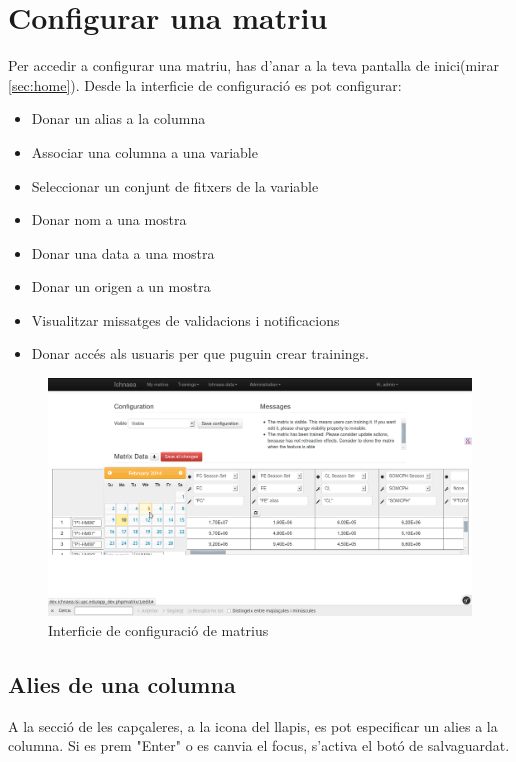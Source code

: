 \section{Configurar una matriu}
\label{sec:configure_matrix}
Per accedir a configurar una matriu, has d'anar a la teva pantalla de inici(mirar \ref{sec:home}). 
Desde la interficie de configuraci\'{o} es pot configurar:
\begin{itemize}
\item Donar un alias a la columna
\item Associar una columna a una variable
\item Seleccionar un conjunt de fitxers de la variable
\item Donar nom a una mostra
\item Donar una data a una mostra
\item Donar un origen a un mostra
\item Visualitzar missatges de validacions i notificacions
\item Donar acc\'{e}s als usuaris per que puguin crear trainings.
\end{itemize}
\begin{figure}[h!]
  \centering
  \includegraphics[scale=0.2]{img/userguide/matrix_configure.png}
  \caption{Interficie de configuraci\'{o} de matrius}
  \label{fig:configure_matrix}
\end{figure}

\subsection{Alies de una columna} 
A la secci\'{o} de les capçaleres, a la icona del llapis, es pot especificar un alies a la columna. Si es prem "Enter" o es canvia el focus, s'activa el bot\'{o} de salvaguardat.

